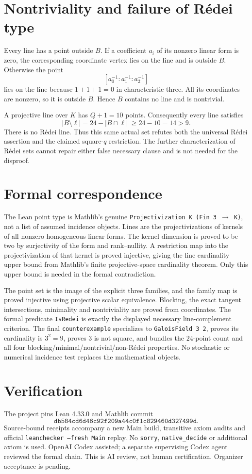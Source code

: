 \documentclass[11pt]{article}
\begin{document}
\newpage
\section{Nontriviality and failure of R\'edei type}
Every line has a point outside $B$. If a coefficient $a_i$ of its
nonzero linear form is zero, the corresponding coordinate vertex
lies on the line and is outside $B$. Otherwise the point
\[
 [a_0^{-1}:a_1^{-1}:a_2^{-1}]
\]
lies on the line because $1+1+1=0$ in characteristic three. All its
coordinates are nonzero, so it is outside $B$. Hence $B$ contains no
line and is nontrivial.

A projective line over $K$ has $Q+1=10$ points. Consequently every
line satisfies
\[
 |B\setminus\ell|=24-|B\cap\ell|\ \ge 24-10=14>9.
\]
There is no R\'edei line. Thus this same actual set refutes both the
universal R\'edei assertion and the claimed square-$q$ restriction.
The further characterization of R\'edei sets cannot repair either
false necessary clause and is not needed for the disproof.

\section{Formal correspondence}
The Lean point type is Mathlib's genuine
\texttt{Projectivization K (Fin 3 $\to$ K)}, not a list of assumed
incidence objects. Lines are the projectivizations of kernels of
all nonzero homogeneous linear forms. The kernel dimension is
proved to be two by surjectivity of the form and rank--nullity.
A restriction map into the projectivization of that kernel is
proved injective, giving the line cardinality upper bound from
Mathlib's finite projective-space cardinality theorem. Only this
upper bound is needed in the formal contradiction.

The point set is the image of the explicit three families, and the
family map is proved injective using projective scalar equivalence.
Blocking, the exact tangent intersections, minimality and
nontriviality are proved from coordinates. The formal predicate
\texttt{IsRedei} is exactly the displayed necessary line-complement
criterion. The final \texttt{counterexample} specializes to
\texttt{GaloisField 3 2}, proves its cardinality is $3^2=9$, proves
$3$ is not square, and bundles the $24$-point count and all four
blocking/minimal/nontrivial/non-R\'edei properties. No stochastic
or numerical incidence test replaces the mathematical objects.

\section{Verification}
The project pins Lean 4.33.0 and Mathlib commit
\[
\texttt{db584cd6d46c92f209a44c0f1c829460d327499d}.
\]
Source-bound receipts accompany a new Main build, transitive axiom
audits and official \texttt{leanchecker --fresh Main} replay.
No \texttt{sorry}, \texttt{native\_decide} or additional axiom is used.
OpenAI Codex assisted; a separate supervising Codex agent reviewed
the formal chain. This is AI review, not human certification.
Organizer acceptance is pending.
\end{document}
